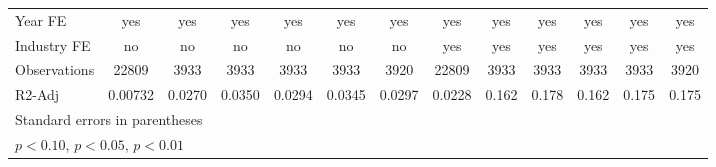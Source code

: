 {\begin{tabular}{l*{12}{c}}
\hline
Year FE             &         yes         &         yes         &         yes         &         yes         &         yes         &         yes         &         yes         &         yes         &         yes         &         yes         &         yes         &         yes         \\
Industry FE         &          no         &          no         &          no         &          no         &          no         &          no         &         yes         &         yes         &         yes         &         yes         &         yes         &         yes         \\
Observations        &       22809         &        3933         &        3933         &        3933         &        3933         &        3920         &       22809         &        3933         &        3933         &        3933         &        3933         &        3920         \\
R2-Adj              &     0.00732         &      0.0270         &      0.0350         &      0.0294         &      0.0345         &      0.0297         &      0.0228         &       0.162         &       0.178         &       0.162         &       0.175         &       0.175         \\
\hline\hline
\multicolumn{13}{l}{\footnotesize Standard errors in parentheses}\\
\multicolumn{13}{l}{\footnotesize \sym{*} \(p<0.10\), \sym{**} \(p<0.05\), \sym{***} \(p<0.01\)}\\
\end{tabular}
}
